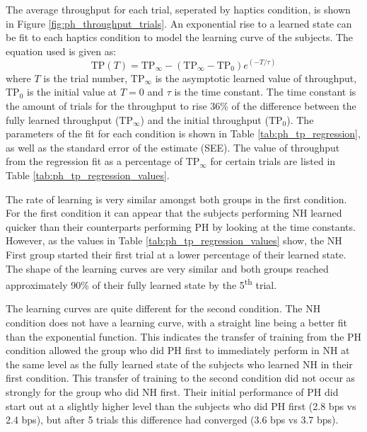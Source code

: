 The average throughput for each trial, seperated by haptics condition, is shown in Figure \ref{fig:ph_throughput_trials}.
An exponential rise to a learned state can be fit to each haptics condition to model the learning curve of the subjects.
The equation used is given as:
\begin{equation}
    \mathrm{TP}(T) = \mathrm{TP}_{\infty} - (\mathrm{TP}_{\infty}-\mathrm{TP}_0)e^{\left( -T / \tau \right)}
    \label{eq:ph_learning}
\end{equation}
where $T$ is the trial number, $\mathrm{TP}_{\infty}$ is the asymptotic learned value of throughput, $\mathrm{TP}_0$ is the initial value at $T=0$ and $\tau$ is the time constant.
The time constant is the amount of trials for the throughput to rise 36\% of the difference between the fully learned throughput ($\mathrm{TP}_{\infty}$) and the initial throughput ($\mathrm{TP}_0$).
The parameters of the fit for each condition is shown in Table \ref{tab:ph_tp_regression}, as well as the standard error of the estimate (SEE).
The value of throughput from the regression fit as a percentage of $\mathrm{TP}_{\infty}$ for certain trials are listed in Table \ref{tab:ph_tp_regression_values}.

The rate of learning is very similar amongst both groups in the first condition.
For the first condition it can appear that the subjects performing NH learned quicker than their counterparts performing PH by looking at the time constants.
However, as the values in Table \ref{tab:ph_tp_regression_values} show, the NH First group started their first trial at a lower percentage of their learned state.
The shape of the learning curves are very similar and both groups reached approximately 90\% of their fully learned state by the 5\textsuperscript{th} trial.

The learning curves are quite different for the second condition.
The NH condition does not have a learning curve, with a straight line being a better fit than the exponential function.
This indicates the transfer of training from the PH condition allowed the group who did PH first to immediately perform in NH at the same level as the fully learned state of the subjects who learned NH in their first condition.
This transfer of training to the second condition did not occur as strongly for the group who did NH first.
Their initial performance of PH did start out at a slightly higher level than the subjects who did PH first (2.8 bps vs 2.4 bps), but after 5 trials this difference had converged (3.6 bps vs 3.7 bps).

